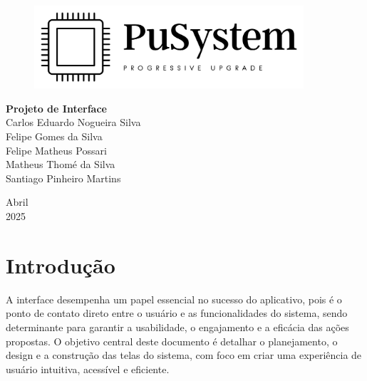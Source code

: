 \documentclass[a4paper, 12pt]{article}
\begin{document}
\begin{titlepage}
	\begin{center}
	
	\begin{figure}[!ht]
	\centering
	  \includegraphics[width=10cm]{dist/LogoTransparentePreto.png} \\ 
    \end{figure}

	\vspace{115pt}
    \textbf{\Huge{Projeto de Interface}}\\
        
	\vspace{115pt}
    Carlos Eduardo Nogueira Silva \\
    Felipe Gomes da Silva \\
    Felipe Matheus Possari \\
    Matheus Thomé da Silva\\ 
    Santiago Pinheiro Martins \\
	\end{center}
	
	\vspace{1cm}
	\begin{center}
		\vspace{\fill}
		Abril \\
		2025
	\end{center}
\end{titlepage}

\newpage
\thispagestyle{empty}
\tableofcontents

\newpage
\pagestyle{fancy}
\fancyhead[L]{\thepage}
\fancyhead[C]{\nouppercase{\leftmark}}
\fancyfoot[R]{}
\fancyfoot[L]{}
\setlength\headheight{26pt}

\section{Introdução}
A interface desempenha um papel essencial no sucesso do aplicativo, pois é o ponto de contato direto entre o usuário e as funcionalidades do sistema, sendo determinante para garantir a usabilidade, o engajamento e a eficácia das ações propostas. O objetivo central deste documento é detalhar o planejamento, o design e a construção das telas do sistema, com foco em criar uma experiência de usuário intuitiva, acessível e eficiente.
\end{document}
